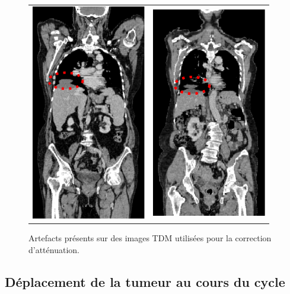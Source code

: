 \begin{figure}[h!]
	\begin{center}
		\begin{tabular}{c c}
			\includegraphics[width=5cm]{images/artefactCT1} & \includegraphics[width=5cm]{images/artefactCT2}
		\end{tabular}
	\end{center}
	\caption{Artefacts présents sur des images TDM utilisées pour la correction d'atténuation.} 
	\label{fig:artefactsCT}
\end{figure}


\subsection{Déplacement de la tumeur au cours du cycle}

